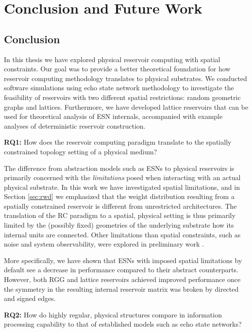 \chapter{Conclusion and Future Work}
\label{ch:conclusion}

\section{Conclusion}

In this thesis we have explored physical reservoir computing with spatial
constraints. Our goal was to provide a better theoretical foundation for how
reservoir computing methodology translates to physical substrates. We conducted
software simulations using echo state network methodology to investigate the
feasibility of reservoirs with two different spatial restrictions: random
geometric graphs and lattices. Furthermore, we have developed lattice reservoirs
that can be used for theoretical analysis of ESN internals, accompanied with
example analyses of deterministic reservoir construction.

\textbf{RQ1:} How does the reservoir computing paradigm translate to the
spatially constrained topology setting of a physical medium?

The difference from abstraction models such as ESNs to physical reservoirs is
primarily concerned with the \textit{limitations} posed when interacting with an
actual physical substrate. In this work we have investigated spatial
limitations, and in Section \ref{sec:rwd} we emphasized that the weight
distribution resulting from a spatially constrained reservoir is different from
unrestricted architectures. The translation of the RC paradigm to a spatial,
physical setting is thus primarily limited by the (possibly fixed) geometries of
the underlying substrate how its internal units are connected. Other limitations
than spatial constraints, such as noise and system observability, were explored
in preliminary work \cite{aven_exploring_2019}.

More specifically, we have shown that ESNs with imposed spatial limitations by
default see a decrease in performance compared to their abstract
counterparts. However, both RGG and lattice reservoirs achieved improved
performance once the symmetry in the resulting internal reservoir matrix was
broken by directed and signed edges.

\textbf{RQ2:} How do highly regular, physical structures compare in information
processing capability to that of established models such as echo state networks?


